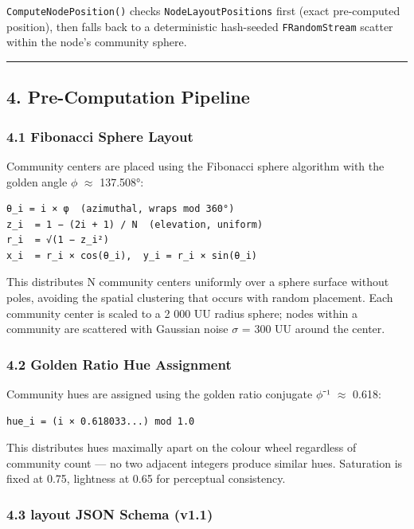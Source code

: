 \texttt{ComputeNodePosition()} checks \texttt{NodeLayoutPositions} first (exact pre-computed position), then falls back to a deterministic hash-seeded \texttt{FRandomStream} scatter within the node's community sphere.

\medskip\noindent\rule{\linewidth}{0.4pt}\medskip

\subsection*{4. Pre-Computation Pipeline}

\subsubsection*{4.1 Fibonacci Sphere Layout}

Community centers are placed using the Fibonacci sphere algorithm with the golden angle $\phi$ $\approx$ 137.508°:

\begin{lstlisting}
θ_i = i × φ  (azimuthal, wraps mod 360°)
z_i  = 1 − (2i + 1) / N  (elevation, uniform)
r_i  = √(1 − z_i²)
x_i  = r_i × cos(θ_i),  y_i = r_i × sin(θ_i)
\end{lstlisting}

This distributes N community centers uniformly over a sphere surface without poles, avoiding the spatial clustering that occurs with random placement. Each community center is scaled to a 2 000 UU radius sphere; nodes within a community are scattered with Gaussian noise $\sigma$ = 300 UU around the center.

\subsubsection*{4.2 Golden Ratio Hue Assignment}

Community hues are assigned using the golden ratio conjugate $\phi$⁻¹ $\approx$ 0.618:

\begin{lstlisting}
hue_i = (i × 0.618033...) mod 1.0
\end{lstlisting}

This distributes hues maximally apart on the colour wheel regardless of community count --- no two adjacent integers produce similar hues. Saturation is fixed at 0.75, lightness at 0.65 for perceptual consistency.

\subsubsection*{4.3 layout JSON Schema (v1.1)}

